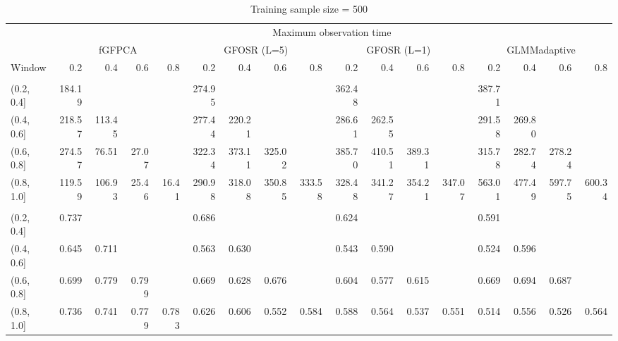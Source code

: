 \documentclass[12pt]{article}
\begin{document}
\begin{landscape}\begin{table}

\begin{subtable}{\textwidth}
\small
\centering
\begin{tabular}{lrrrrrrrrrrrrrrrr}
\toprule
\multicolumn{1}{c}{ } & \multicolumn{16}{c}{Maximum observation time} \\
\cmidrule(l{3pt}r{3pt}){2-17}
\multicolumn{1}{c}{ } & \multicolumn{4}{c}{fGFPCA} & \multicolumn{4}{c}{GFOSR (L=5)} & \multicolumn{4}{c}{GFOSR (L=1)} & \multicolumn{4}{c}{GLMMadaptive} \\
\cmidrule(l{3pt}r{3pt}){2-5} \cmidrule(l{3pt}r{3pt}){6-9} \cmidrule(l{3pt}r{3pt}){10-13} \cmidrule(l{3pt}r{3pt}){14-17}
Window & 0.2 & 0.4 & 0.6 & 0.8 & 0.2 & 0.4 & 0.6 & 0.8 & 0.2 & 0.4 & 0.6 & 0.8 & 0.2 & 0.4 & 0.6 & 0.8\\
\midrule
\addlinespace[0.3em]
\multicolumn{17}{l}{\textbf{ISE}}\\
\hspace{1em}(0.2, 0.4] & 184.19 &  &  &  & 274.95 &  &  &  & 362.48 &  &  &  & 387.71 &  &  & \\
\hspace{1em}(0.4, 0.6] & 218.57 & 113.45 &  &  & 277.44 & 220.21 &  &  & 286.61 & 262.55 &  &  & 291.58 & 269.80 &  & \\
\hspace{1em}(0.6, 0.8] & 274.57 & 76.51 & 27.07 &  & 322.34 & 373.11 & 325.02 &  & 385.70 & 410.51 & 389.31 &  & 315.78 & 282.74 & 278.24 & \\
\hspace{1em}(0.8, 1.0] & 119.59 & 106.93 & 25.46 & 16.41 & 290.98 & 318.08 & 350.85 & 333.58 & 328.48 & 341.27 & 354.21 & 347.07 & 563.01 & 477.49 & 597.75 & 600.34\\
\addlinespace[0.3em]
\multicolumn{17}{l}{\textbf{AUC}}\\
\hspace{1em}(0.2, 0.4] & 0.737 &  &  &  & 0.686 &  &  &  & 0.624 &  &  &  & 0.591 &  &  & \\
\hspace{1em}(0.4, 0.6] & 0.645 & 0.711 &  &  & 0.563 & 0.630 &  &  & 0.543 & 0.590 &  &  & 0.524 & 0.596 &  & \\
\hspace{1em}(0.6, 0.8] & 0.699 & 0.779 & 0.799 &  & 0.669 & 0.628 & 0.676 &  & 0.604 & 0.577 & 0.615 &  & 0.669 & 0.694 & 0.687 & \\
\hspace{1em}(0.8, 1.0] & 0.736 & 0.741 & 0.779 & 0.783 & 0.626 & 0.606 & 0.552 & 0.584 & 0.588 & 0.564 & 0.537 & 0.551 & 0.514 & 0.556 & 0.526 & 0.564\\
\bottomrule
\end{tabular}
\caption{Training sample size = 500}
\label{tab:sim_large}
\end{subtable}



\end{table}
\end{landscape}
\end{document}
